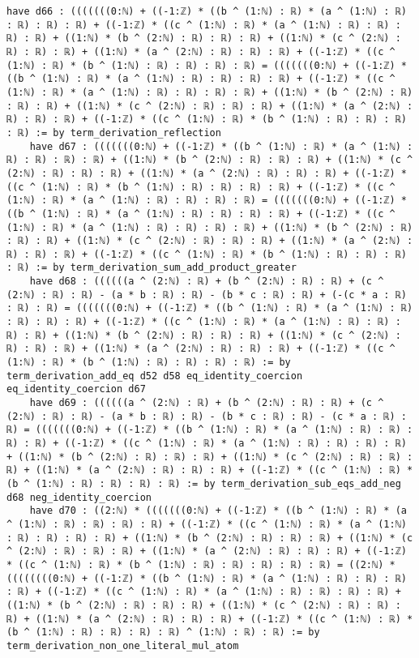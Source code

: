 \documentclass{article}
\begin{document}
\begin{tcolorbox}[colback=white!10, width=\linewidth]
\begin{lstlisting}[language=Lean4]
    have d66 : (((((((0:ℕ) + ((-1:ℤ) * ((b ^ (1:ℕ) : ℝ) * (a ^ (1:ℕ) : ℝ) : ℝ) : ℝ) : ℝ) + ((-1:ℤ) * ((c ^ (1:ℕ) : ℝ) * (a ^ (1:ℕ) : ℝ) : ℝ) : ℝ) : ℝ) + ((1:ℕ) * (b ^ (2:ℕ) : ℝ) : ℝ) : ℝ) + ((1:ℕ) * (c ^ (2:ℕ) : ℝ) : ℝ) : ℝ) + ((1:ℕ) * (a ^ (2:ℕ) : ℝ) : ℝ) : ℝ) + ((-1:ℤ) * ((c ^ (1:ℕ) : ℝ) * (b ^ (1:ℕ) : ℝ) : ℝ) : ℝ) : ℝ) = (((((((0:ℕ) + ((-1:ℤ) * ((b ^ (1:ℕ) : ℝ) * (a ^ (1:ℕ) : ℝ) : ℝ) : ℝ) : ℝ) + ((-1:ℤ) * ((c ^ (1:ℕ) : ℝ) * (a ^ (1:ℕ) : ℝ) : ℝ) : ℝ) : ℝ) + ((1:ℕ) * (b ^ (2:ℕ) : ℝ) : ℝ) : ℝ) + ((1:ℕ) * (c ^ (2:ℕ) : ℝ) : ℝ) : ℝ) + ((1:ℕ) * (a ^ (2:ℕ) : ℝ) : ℝ) : ℝ) + ((-1:ℤ) * ((c ^ (1:ℕ) : ℝ) * (b ^ (1:ℕ) : ℝ) : ℝ) : ℝ) : ℝ) := by term_derivation_reflection
    have d67 : (((((((0:ℕ) + ((-1:ℤ) * ((b ^ (1:ℕ) : ℝ) * (a ^ (1:ℕ) : ℝ) : ℝ) : ℝ) : ℝ) + ((1:ℕ) * (b ^ (2:ℕ) : ℝ) : ℝ) : ℝ) + ((1:ℕ) * (c ^ (2:ℕ) : ℝ) : ℝ) : ℝ) + ((1:ℕ) * (a ^ (2:ℕ) : ℝ) : ℝ) : ℝ) + ((-1:ℤ) * ((c ^ (1:ℕ) : ℝ) * (b ^ (1:ℕ) : ℝ) : ℝ) : ℝ) : ℝ) + ((-1:ℤ) * ((c ^ (1:ℕ) : ℝ) * (a ^ (1:ℕ) : ℝ) : ℝ) : ℝ) : ℝ) = (((((((0:ℕ) + ((-1:ℤ) * ((b ^ (1:ℕ) : ℝ) * (a ^ (1:ℕ) : ℝ) : ℝ) : ℝ) : ℝ) + ((-1:ℤ) * ((c ^ (1:ℕ) : ℝ) * (a ^ (1:ℕ) : ℝ) : ℝ) : ℝ) : ℝ) + ((1:ℕ) * (b ^ (2:ℕ) : ℝ) : ℝ) : ℝ) + ((1:ℕ) * (c ^ (2:ℕ) : ℝ) : ℝ) : ℝ) + ((1:ℕ) * (a ^ (2:ℕ) : ℝ) : ℝ) : ℝ) + ((-1:ℤ) * ((c ^ (1:ℕ) : ℝ) * (b ^ (1:ℕ) : ℝ) : ℝ) : ℝ) : ℝ) := by term_derivation_sum_add_product_greater
    have d68 : ((((((a ^ (2:ℕ) : ℝ) + (b ^ (2:ℕ) : ℝ) : ℝ) + (c ^ (2:ℕ) : ℝ) : ℝ) - (a * b : ℝ) : ℝ) - (b * c : ℝ) : ℝ) + (-(c * a : ℝ) : ℝ) : ℝ) = (((((((0:ℕ) + ((-1:ℤ) * ((b ^ (1:ℕ) : ℝ) * (a ^ (1:ℕ) : ℝ) : ℝ) : ℝ) : ℝ) + ((-1:ℤ) * ((c ^ (1:ℕ) : ℝ) * (a ^ (1:ℕ) : ℝ) : ℝ) : ℝ) : ℝ) + ((1:ℕ) * (b ^ (2:ℕ) : ℝ) : ℝ) : ℝ) + ((1:ℕ) * (c ^ (2:ℕ) : ℝ) : ℝ) : ℝ) + ((1:ℕ) * (a ^ (2:ℕ) : ℝ) : ℝ) : ℝ) + ((-1:ℤ) * ((c ^ (1:ℕ) : ℝ) * (b ^ (1:ℕ) : ℝ) : ℝ) : ℝ) : ℝ) := by term_derivation_add_eq d52 d58 eq_identity_coercion eq_identity_coercion d67
    have d69 : ((((((a ^ (2:ℕ) : ℝ) + (b ^ (2:ℕ) : ℝ) : ℝ) + (c ^ (2:ℕ) : ℝ) : ℝ) - (a * b : ℝ) : ℝ) - (b * c : ℝ) : ℝ) - (c * a : ℝ) : ℝ) = (((((((0:ℕ) + ((-1:ℤ) * ((b ^ (1:ℕ) : ℝ) * (a ^ (1:ℕ) : ℝ) : ℝ) : ℝ) : ℝ) + ((-1:ℤ) * ((c ^ (1:ℕ) : ℝ) * (a ^ (1:ℕ) : ℝ) : ℝ) : ℝ) : ℝ) + ((1:ℕ) * (b ^ (2:ℕ) : ℝ) : ℝ) : ℝ) + ((1:ℕ) * (c ^ (2:ℕ) : ℝ) : ℝ) : ℝ) + ((1:ℕ) * (a ^ (2:ℕ) : ℝ) : ℝ) : ℝ) + ((-1:ℤ) * ((c ^ (1:ℕ) : ℝ) * (b ^ (1:ℕ) : ℝ) : ℝ) : ℝ) : ℝ) := by term_derivation_sub_eqs_add_neg d68 neg_identity_coercion
    have d70 : ((2:ℕ) * (((((((0:ℕ) + ((-1:ℤ) * ((b ^ (1:ℕ) : ℝ) * (a ^ (1:ℕ) : ℝ) : ℝ) : ℝ) : ℝ) + ((-1:ℤ) * ((c ^ (1:ℕ) : ℝ) * (a ^ (1:ℕ) : ℝ) : ℝ) : ℝ) : ℝ) + ((1:ℕ) * (b ^ (2:ℕ) : ℝ) : ℝ) : ℝ) + ((1:ℕ) * (c ^ (2:ℕ) : ℝ) : ℝ) : ℝ) + ((1:ℕ) * (a ^ (2:ℕ) : ℝ) : ℝ) : ℝ) + ((-1:ℤ) * ((c ^ (1:ℕ) : ℝ) * (b ^ (1:ℕ) : ℝ) : ℝ) : ℝ) : ℝ) : ℝ) = ((2:ℕ) * ((((((((0:ℕ) + ((-1:ℤ) * ((b ^ (1:ℕ) : ℝ) * (a ^ (1:ℕ) : ℝ) : ℝ) : ℝ) : ℝ) + ((-1:ℤ) * ((c ^ (1:ℕ) : ℝ) * (a ^ (1:ℕ) : ℝ) : ℝ) : ℝ) : ℝ) + ((1:ℕ) * (b ^ (2:ℕ) : ℝ) : ℝ) : ℝ) + ((1:ℕ) * (c ^ (2:ℕ) : ℝ) : ℝ) : ℝ) + ((1:ℕ) * (a ^ (2:ℕ) : ℝ) : ℝ) : ℝ) + ((-1:ℤ) * ((c ^ (1:ℕ) : ℝ) * (b ^ (1:ℕ) : ℝ) : ℝ) : ℝ) : ℝ) ^ (1:ℕ) : ℝ) : ℝ) := by term_derivation_non_one_literal_mul_atom

\end{lstlisting}
\end{tcolorbox}
\end{document}
